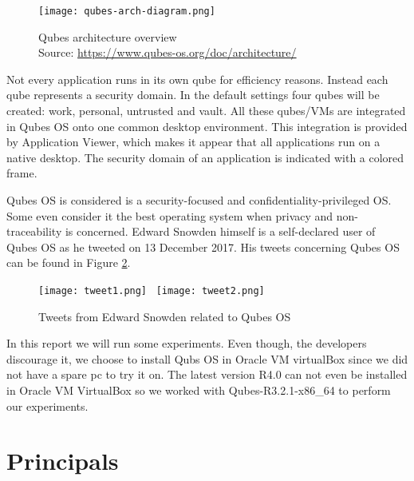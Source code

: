 \documentclass[runningheads,a4paper]{article}
\begin{document}
\begin{figure}[h]
  \centering
  \texttt{[image: qubes-arch-diagram.png]}
  \caption{Qubes architecture overview\\
    Source: \protect\url{https://www.qubes-os.org/doc/architecture/}}
  \label{fig:qubesarch}
\end{figure}

Not every application runs in its own qube for efficiency reasons. Instead
each qube represents a security domain. In the default settings four
qubes will be created: work, personal, untrusted and vault. All these
qubes/VMs are integrated in Qubes OS onto one common desktop
environment. This integration is provided by Application Viewer, which
makes it appear that all applications run on a native desktop. The
security domain of an application is indicated with a colored frame.

Qubes OS is considered is a security-focused and confidentiality-privileged OS. Some even consider it the best operating system when privacy and non-traceability is concerned. Edward Snowden himself is a self-declared user of Qubes OS as he tweeted on 13 December 2017. His tweets concerning Qubes OS can be found in Figure \ref{fig:tweets}.

\begin{figure}[h]
  \centering
  \texttt{[image: tweet1.png]}~
  \texttt{[image: tweet2.png]}
  \caption{Tweets from Edward Snowden related to Qubes OS}
  \label{fig:tweets}
\end{figure}

In this report we will run some experiments. Even though, the developers discourage it, we choose to install Qubs OS in Oracle VM virtualBox since we did not have a spare pc to try it on. The latest version R4.0 can not even be installed in Oracle VM VirtualBox so we worked with Qubes-R3.2.1-x86\_64 to perform our experiments.

\section{Principals} 
\end{document}
